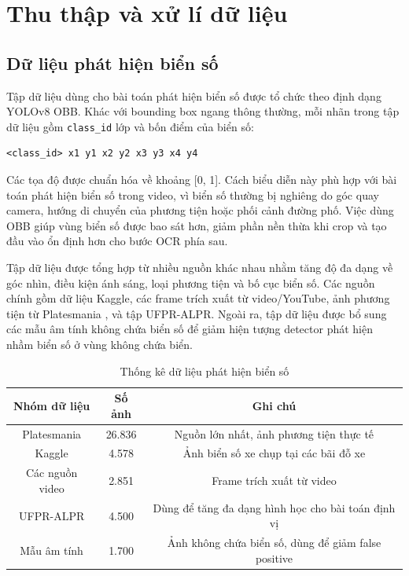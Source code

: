 \documentclass[../DoAn.tex]{subfiles}
\begin{document}
\section{Thu thập và xử lí dữ liệu}
\label{section:4.data}
\subsection{Dữ liệu phát hiện biển số}
\label{subsection:4.data.1}

Tập dữ liệu dùng cho bài toán phát hiện biển số được tổ chức theo định dạng YOLOv8 OBB. Khác với bounding box ngang thông thường, mỗi nhãn trong tập dữ liệu gồm \texttt{class\_id} lớp và bốn điểm của biển số:

\begin{verbatim}
<class_id> x1 y1 x2 y2 x3 y3 x4 y4
\end{verbatim}

Các tọa độ được chuẩn hóa về khoảng [0, 1]. Cách biểu diễn này phù hợp với bài toán phát hiện biển số trong video, vì biển số thường bị nghiêng do góc quay camera, hướng di chuyển của phương tiện hoặc phối cảnh đường phố. Việc dùng OBB giúp vùng biển số được bao sát hơn, giảm phần nền thừa khi crop và tạo đầu vào ổn định hơn cho bước OCR phía sau.

Tập dữ liệu được tổng hợp từ nhiều nguồn khác nhau nhằm tăng độ đa dạng về góc nhìn, điều kiện ánh sáng, loại phương tiện và bố cục biển số. Các nguồn chính gồm dữ liệu Kaggle, các frame trích xuất từ video/YouTube, ảnh phương tiện từ Platesmania \cite{platesmania}, và tập UFPR-ALPR. Ngoài ra, tập dữ liệu được bổ sung các mẫu âm tính không chứa biển số để giảm hiện tượng detector phát hiện nhầm biển số ở vùng không chứa biển.

\begin{table}[htbp]
\centering
\caption{Thống kê dữ liệu phát hiện biển số}

\begin{tabular}{|c|c|c|}
\hline
Nhóm dữ liệu & Số ảnh & Ghi chú \\
\hline
Platesmania \cite{platesmania} & 26.836 & Nguồn lớn nhất, ảnh phương tiện thực tế \\
Kaggle & 4.578 & Ảnh biển số xe chụp tại các bãi đỗ xe \\
Các nguồn video & 2.851 & Frame trích xuất từ video \\
UFPR-ALPR & 4.500 & Dùng để tăng đa dạng hình học cho bài toán định vị \\
Mẫu âm tính & 1.700 & Ảnh không chứa biển số, dùng để giảm false positive \\
\hline
\end{tabular}
\end{table}
\end{document}
